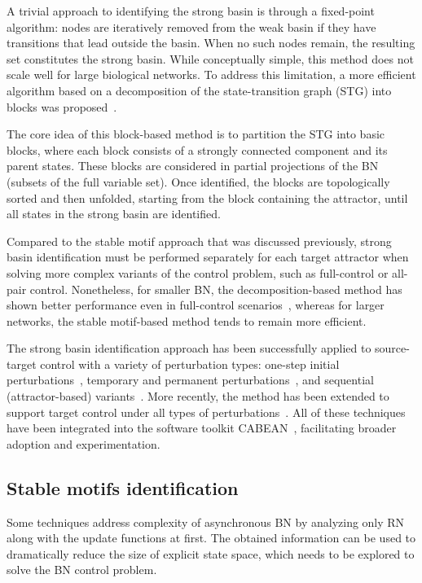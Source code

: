 A trivial approach to identifying the strong basin is through a fixed-point algorithm: nodes are iteratively removed from the weak basin if they have transitions that lead outside the basin. When no such nodes remain, the resulting set constitutes the strong basin. While conceptually simple, this method does not scale well for large biological networks. To address this limitation, a more efficient algorithm based on a decomposition of the state-transition graph (STG) into blocks was proposed~\cite{Paul2018BCB}.

The core idea of this block-based method is to partition the STG into basic blocks, where each block consists of a strongly connected component and its parent states. These blocks are considered in partial projections of the BN (subsets of the full variable set). Once identified, the blocks are topologically sorted and then unfolded, starting from the block containing the attractor, until all states in the strong basin are identified.

Compared to the stable motif approach that was discussed previously, strong basin identification must be performed separately for each target attractor when solving more complex variants of the control problem, such as full-control or all-pair control. Nonetheless, for smaller BN, the decomposition-based method has shown better performance even in full-control scenarios~\cite{Paul2018CMSB}, whereas for larger networks, the stable motif-based method tends to remain more efficient.

The strong basin identification approach has been successfully applied to source-target control with a variety of perturbation types: one-step initial perturbations~\cite{Paul2018BCB, Paul2018CMSB}, temporary and permanent perturbations~\cite{Su2019FM}, and sequential (attractor-based) variants~\cite{Mandon2019CMSB, Su2020}. More recently, the method has been extended to support target control under all types of perturbations~\cite{Su2020BCB,Su2020phd}. All of these techniques have been integrated into the software toolkit CABEAN~\cite{Su2020Bioinformatics}, facilitating broader adoption and experimentation.

\subsection{Stable motifs identification} \label{ss:stablemotifidentification}

Some techniques address complexity of asynchronous BN by analyzing only RN along with the update functions at first. The obtained information can be used to dramatically reduce the size of explicit state space, which needs to be explored to solve the BN control problem. 

